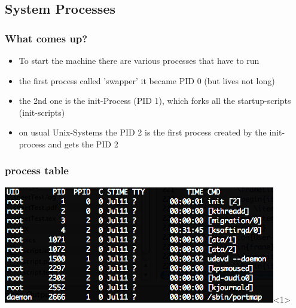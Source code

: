 \documentclass[hyperref={pdfpagelabels=false}]{beamer}
\begin{document}
    \subsection{System Processes}
	    \begin{frame}
			\frametitle{What comes up?}
			\begin{itemize}
                \item<1-> To start the machine there are various processes that have to run
                \item<1-> the first process called 'swapper' it became PID 0 (but lives not long)
                \item<2-> the 2nd one is the init-Process (PID 1), which forks all the startup-scripts (init-scripts)
                \item<3-> on usual Unix-Systems the PID 2 is the first process created by the init-process and gets the PID 2
            \end{itemize}
		\end{frame}
	    \begin{frame}
			\frametitle{process table}
			\includegraphics[height=0.4\columnwidth]{pics/ps.png}<1>%
		\end{frame}
\end{document}
